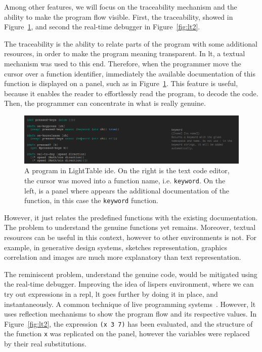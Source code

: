 Among other features, we will focus on the traceability mechanism and the ability to make the program flow visible. First, the traceability, showed in Figure~\ref{fig:lt1}, and second the real-time debugger in Figure~\ref{fig:lt2}.

The traceability is the ability to relate parts of the program with some additional resources, in order to make the program meaning transparent. In \ac{lt}, a textual mechanism was used to this end. Therefore, when the programmer move the cursor over a function identifier, immediately the available documentation of this function is displayed on a panel, such as in Figure~\ref{fig:lt1}. This feature is useful, because it enables the reader to effortlessly read the program, to decode the code. Then, the programmer can concentrate in what is really genuine.

\begin{figure}[h]
  \centering
  \includegraphics[width=1.0\textwidth]{img/lt2}
    \caption{A program in LightTable \ac{ide}. On the right is the text code editor, the cursor was moved into a function name, i.e. {\tt keyword}. On the left, is a panel where appears the additional documentation of the function, in this case the {\tt keyword} function.}  
  \label{fig:lt1}
\end{figure}

However, it just relates the predefined functions with the existing documentation. The problem to understand the genuine functions yet remains. Moreover, textual resources can be useful in this context, however to other environments is not. For example, in generative design systems, sketches representation, graphics correlation and images are much more explanatory than text representation.  

The reminiscent problem, understand the genuine code, would be mitigated using the real-time debugger. Improving the idea of lispers environment, where we can try out expressions in a \ac{repl}, \ac{lt} goes further by doing it in place, and instantaneously. A common technique of live programming systems~\cite{PER-GRA:2007,sorensen2005impromptu,mclean2010visualisation}. However, \ac{lt} uses reflection mechanisms to show the program flow and its respective values. In Figure~\ref{fig:lt2},  the expression {\tt (x 3 7)} has been evaluated, and the structure of the function {\tt x} was replicated on the panel, however the variables were replaced by their real substitutions.

